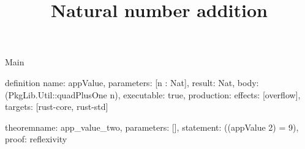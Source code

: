 \begin{lexlean}{Main}
\title{Natural number addition}
\begin{semanticmodule}
definition{
  name: appValue,
  parameters: [n : Nat],
  result: Nat,
  body: (PkgLib.Util::quadPlusOne n),
  executable: true,
  production: {effects: [overflow], targets: [rust-core, rust-std]}
}

theorem{name: app_value_two, parameters: [], statement: ((appValue 2) = 9), proof: reflexivity{}}
\end{semanticmodule}
\end{lexlean}
